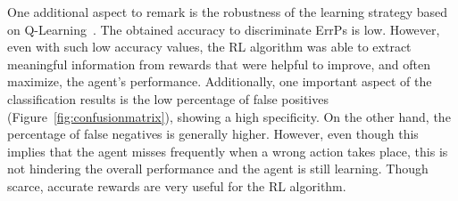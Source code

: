 \documentclass[journal]{IEEEtran}
\begin{document}
{{One additional aspect to remark is the robustness of the learning strategy based on Q-Learning~\cite{Bauer2015,Rubin2012}.  The obtained accuracy to discriminate ErrPs is low.  However, even with such low accuracy values, the RL algorithm was able to extract meaningful information from rewards that were helpful to improve, and often maximize, the agent's performance.  Additionally, one important aspect of the classification results is the low percentage of false positives (Figure~\ref{fig:confusionmatrix}), showing a high specificity. On the other hand, the percentage of false negatives is generally higher.  However, even though this implies that the agent misses frequently when a wrong action takes place, this is not hindering the overall performance and the agent is still learning. Though scarce, accurate rewards are very useful for the RL algorithm.



}}
\end{document}
